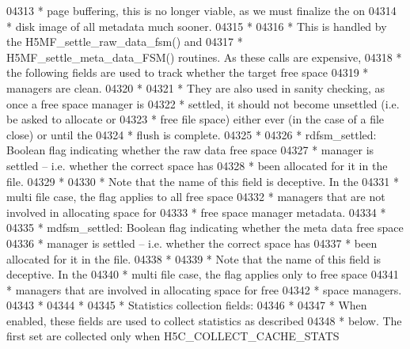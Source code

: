 \begin{DoxyCode}
04313 \textcolor{comment}{ * page buffering, this is no longer viable, as we must finalize the on }
04314 \textcolor{comment}{ * disk image of all metadata much sooner.}
04315 \textcolor{comment}{ *}
04316 \textcolor{comment}{ * This is handled by the H5MF\_settle\_raw\_data\_fsm() and}
04317 \textcolor{comment}{ * H5MF\_settle\_meta\_data\_FSM() routines.  As these calls are expensive,}
04318 \textcolor{comment}{ * the following fields are used to track whether the target free space}
04319 \textcolor{comment}{ * managers are clean.}
04320 \textcolor{comment}{ *}
04321 \textcolor{comment}{ * They are also used in sanity checking, as once a free space manager is}
04322 \textcolor{comment}{ * settled, it should not become unsettled (i.e. be asked to allocate or}
04323 \textcolor{comment}{ * free file space) either ever (in the case of a file close) or until the}
04324 \textcolor{comment}{ * flush is complete.}
04325 \textcolor{comment}{ *}
04326 \textcolor{comment}{ * rdfsm\_settled:  Boolean flag indicating whether the raw data free space}
04327 \textcolor{comment}{ *      manager is settled -- i.e. whether the correct space has }
04328 \textcolor{comment}{ *      been allocated for it in the file.}
04329 \textcolor{comment}{ *}
04330 \textcolor{comment}{ *      Note that the name of this field is deceptive.  In the }
04331 \textcolor{comment}{ *      multi file case, the flag applies to all free space }
04332 \textcolor{comment}{ *      managers that are not involved in allocating space for}
04333 \textcolor{comment}{ *      free space manager metadata.}
04334 \textcolor{comment}{ *}
04335 \textcolor{comment}{ * mdfsm\_settled:  Boolean flag indicating whether the meta data free space}
04336 \textcolor{comment}{ *              manager is settled -- i.e. whether the correct space has}
04337 \textcolor{comment}{ *              been allocated for it in the file.}
04338 \textcolor{comment}{ *}
04339 \textcolor{comment}{ *              Note that the name of this field is deceptive.  In the }
04340 \textcolor{comment}{ *              multi file case, the flag applies only to free space }
04341 \textcolor{comment}{ *      managers that are involved in allocating space for free }
04342 \textcolor{comment}{ *      space managers.}
04343 \textcolor{comment}{ *}
04344 \textcolor{comment}{ *}
04345 \textcolor{comment}{ * Statistics collection fields:}
04346 \textcolor{comment}{ *}
04347 \textcolor{comment}{ * When enabled, these fields are used to collect statistics as described}
04348 \textcolor{comment}{ * below.  The first set are collected only when H5C\_COLLECT\_CACHE\_STATS}

\end{DoxyCode}
